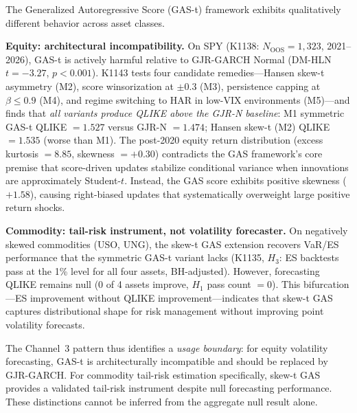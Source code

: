 \documentclass[12pt,a4paper]{article}
\begin{document}
The Generalized Autoregressive Score (GAS-t) framework \citep{crealetal2013} exhibits qualitatively different behavior across asset classes.

\textbf{Equity: architectural incompatibility.} On SPY (K1138: $N_{\text{OOS}} = 1{,}323$, 2021--2026), GAS-t is actively harmful relative to GJR-GARCH Normal (DM-HLN $t = -3.27$, $p < 0.001$). K1143 tests four candidate remedies---Hansen skew-t asymmetry (M2), score winsorization at $\pm0.3$ (M3), persistence capping at $\beta \leq 0.9$ (M4), and regime switching to HAR in low-VIX environments (M5)---and finds that \emph{all variants produce QLIKE above the GJR-N baseline}: M1 symmetric GAS-t QLIKE $= 1.527$ versus GJR-N $= 1.474$; Hansen skew-t (M2) QLIKE $= 1.535$ (worse than M1). The post-2020 equity return distribution (excess kurtosis $= 8.85$, skewness $= +0.30$) contradicts the GAS framework's core premise that score-driven updates stabilize conditional variance when innovations are approximately Student-$t$. Instead, the GAS score exhibits positive skewness ($+1.58$), causing right-biased updates that systematically overweight large positive return shocks.

\textbf{Commodity: tail-risk instrument, not volatility forecaster.} On negatively skewed commodities (USO, UNG), the skew-t GAS extension \citep{hansen1994} recovers VaR/ES performance that the symmetric GAS-t variant lacks (K1135, $H_3$: ES backtests pass at the 1\% level for all four assets, BH-adjusted). However, forecasting QLIKE remains null (0 of 4 assets improve, $H_1$ pass count $= 0$). This bifurcation---ES improvement without QLIKE improvement---indicates that skew-t GAS captures distributional shape for risk management without improving point volatility forecasts.

The Channel~3 pattern thus identifies a \emph{usage boundary}: for equity volatility forecasting, GAS-t is architecturally incompatible and should be replaced by GJR-GARCH. For commodity tail-risk estimation specifically, skew-t GAS provides a validated tail-risk instrument despite null forecasting performance. These distinctions cannot be inferred from the aggregate null result alone.
\end{document}
